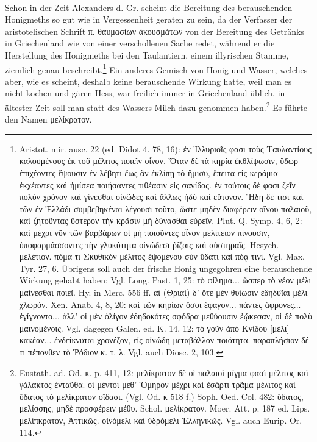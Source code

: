 \documentclass[a4paper, 11pt, oneside]{article}
\begin{document}
\paragraph{}
Schon in der Zeit Alexanders d. Gr. scheint die Bereitung des berauschenden Honigmeths so gut wie in Vergessenheit geraten zu sein, da der Verfasser der aristotelischen Schrift π. θαυμασίων ἀκουσμάτων von der Bereitung des Getränks in Griechenland wie von einer verschollenen Sache redet, während er die Herstellung des Honigmeths bei den Taulantiern, einem illyrischen Stamme, ziemlich genau beschreibt.\footnote{Aristot. mir. ausc. 22 (ed. Didot 4. 78, 16): ἐν Ἰλλυριοῖς φασι τοὺς Ταυλαντίους καλουμένους ἐκ τοῦ μέλιτος ποιεῖν οἷνον. Ὅταν δὲ τὰ κηρία ἐκθλίψωσιν, ὕδωρ ἐπιχέοντες ἔψουσιν ἐν λέβητι ἕως ἂν ἐκλίπῃ τὸ ἥμισυ, ἔπειτα εἰς κεράμια ἐκχέαντες καὶ ἡμίσεα ποιήσαντες τιθέασιν εἰς σανίδας. ἐν τούτοις δὲ φασι ζεῖν πολὺν χρόνον καὶ γίνεσθαι οἰνῶδες καὶ ἄλλως ἡδὺ καὶ εὔτονον. Ἤδη δὲ τισι καὶ τῶν ἐν Ἑλλάδι συμβεβηκέναι λέγουσι τοῦτο, ὥστε μηδὲν διαφέρειν οἴνου παλαιοῦ, καὶ ζητοῦντας ὕστερον τὴν κρᾶσιν μὴ δύνασθαι εὑρεῖν. Plut. Q. Symp. 4, 6, 2: καὶ μέχρι νῦν τῶν βαρβάρων οἱ μὴ ποιοῦντες οἶνον μελίτειον πίνουσιν, ὑποφαρμάσσοντες τὴν γλυκύτητα οἰνώδεσι ῥίζαις καὶ αὐστηραῖς. Hesych. μελέτιον. πόμα τι Σκυθικὸν μέλιτος ἑψομένου σὺν ὕδατι καὶ πόᾳ τινί. Vgl. Max. Tyr. 27, 6. Übrigens soll auch der frische Honig ungegohren eine berauschende Wirkung gehabt haben: Vgl. Long. Past. 1, 25: τὸ φίλημα... ὥσπερ τὸ νέον μέλι μαίνεσθαι ποιεῖ. Hy. in Merc. 556 ff. αἳ (Θριαὶ) δ' ὅτε μὲν θυίωσιν ἐδηδυῖαι μέλι χλωρόν. Xen. Anab. 4, 8, 20: καὶ τῶν κηρίων ὅσοι ἔφαγον... πάντες ἄφρονες... ἐγίγνοντο... ἀλλ' οἱ μὲν ὀλίγον ἐδηδοκότες σφόδρα μεθύουσιν ἐῴκεσαν, οἱ δὲ πολὺ μαινομένοις. Vgl. dagegen Galen. ed. K. 14, 12: τὸ γοῦν ἀπὸ Κνίδου [μέλι] κακέαν... ἐνδείκνυται χρονέζον, εἰς οἰνώδη μεταβάλλον ποιότητα. παραπλήσιον δέ τι πέπονθεν τὸ Ῥόδιον κ. τ. λ. Vgl. auch Diosc. 2, 103.} Ein anderes Gemisch von Honig und Wasser, welches aber, wie es scheint, deshalb keine berauschende Wirkung hatte, weil man es nicht kochen und gären Hess, war freilich immer in Griechenland üblich, in ältester Zeit soll man statt des Wassers Milch dazu genommen haben.\footnote{Eustath. ad. Od. κ. p. 411, 12: μελίκρατον δὲ οἱ παλαιοὶ μίγμα φασὶ μέλιτος καὶ γάλακτος ἐνταῦθα. οἱ μέντοι μεθ' Ὅμηρον μέχρι καὶ ἐσάρτι τρᾶμα μέλιτος καὶ ὕδατος τὸ μελίκρατον οἴδασι. (Vgl. Od. κ 518 f.) Soph. Oed. Col. 482: ὕδατος, μελίσσης, μηδὲ προσφέρειν μέθυ. Schol. μελίκρατον. Moer. Att. p. 187 ed. Lips. μελίπκρατον, Ἀττικῶς. οἰνόμελι καὶ ὑδρόμελι Ἐλληνικῶς. Vgl. auch Eurip. Or. 114.} Es führte den Namen μελίκρατον.
\end{document}

